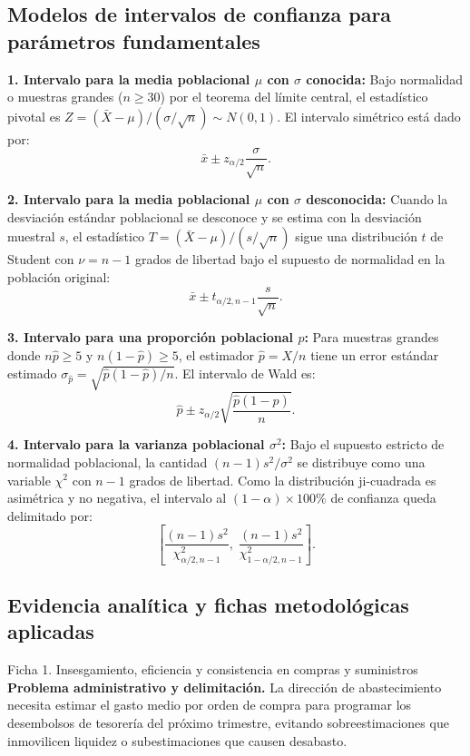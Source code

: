 {\subsection{Modelos de intervalos de confianza para parámetros fundamentales}
\textbf{1. Intervalo para la media poblacional $\mu$ con $\sigma$ conocida:}
Bajo normalidad o muestras grandes ($n \ge 30$) por el teorema del límite central, el estadístico pivotal es $Z = (\bar{X} - \mu)/(\sigma/\sqrt{n}) \sim N(0, 1)$. El intervalo simétrico está dado por:
\[
  \bar{x} \pm z_{\alpha/2} \frac{\sigma}{\sqrt{n}}.
\]

\textbf{2. Intervalo para la media poblacional $\mu$ con $\sigma$ desconocida:}
Cuando la desviación estándar poblacional se desconoce y se estima con la desviación muestral $s$, el estadístico $T = (\bar{X} - \mu)/(s/\sqrt{n})$ sigue una distribución $t$ de Student con $\nu = n-1$ grados de libertad bajo el supuesto de normalidad en la población original:
\[
  \bar{x} \pm t_{\alpha/2, n-1} \frac{s}{\sqrt{n}}.
\]

\textbf{3. Intervalo para una proporción poblacional $p$:}
Para muestras grandes donde $n\hat{p} \ge 5$ y $n(1-\hat{p}) \ge 5$, el estimador $\hat{p} = X/n$ tiene un error estándar estimado $\sigma_{\hat{p}} = \sqrt{\hat{p}(1-\hat{p})/n}$. El intervalo de Wald es:
\[
  \hat{p} \pm z_{\alpha/2} \sqrt{\frac{\hat{p}(1-\hat{p})}{n}}.
\]

\textbf{4. Intervalo para la varianza poblacional $\sigma^2$:}
Bajo el supuesto estricto de normalidad poblacional, la cantidad $(n-1)s^2/\sigma^2$ se distribuye como una variable $\chi^2$ con $n-1$ grados de libertad. Como la distribución ji-cuadrada es asimétrica y no negativa, el intervalo al $(1-\alpha)\times 100\%$ de confianza queda delimitado por:
\[
  \left[ \frac{(n-1)s^2}{\chi^2_{\alpha/2, n-1}}, \; \frac{(n-1)s^2}{\chi^2_{1-\alpha/2, n-1}} \right].
\]

\subsection{Evidencia analítica y fichas metodológicas aplicadas}

\begin{fichainvestigacion}{Ficha 1. Insesgamiento, eficiencia y consistencia en compras y suministros}
\textbf{Problema administrativo y delimitación.} La dirección de abastecimiento necesita estimar el gasto medio por orden de compra para programar los desembolsos de tesorería del próximo trimestre, evitando sobreestimaciones que inmovilicen liquidez o subestimaciones que causen desabasto.


\end{fichainvestigacion}}
